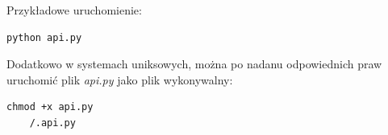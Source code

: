 \documentclass[11pt, wide]{article}
\begin{document}
    Przykładowe uruchomienie:
    \begin{lstlisting}[style=CStyle]
    python api.py\end{lstlisting}    
    Dodatkowo w systemach uniksowych, można po nadanu odpowiednich praw uruchomić plik \textit{api.py} 
    jako plik wykonywalny:
    \begin{lstlisting}[style=CStyle]
    chmod +x api.py
    /.api.py\end{lstlisting}
\end{document}

